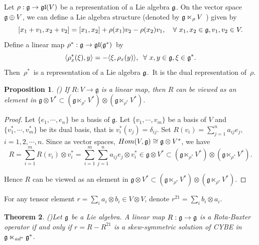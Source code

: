 \documentclass[12pt, reqno]{amsart}
\theoremstyle{plain}
\newtheorem{theorem}{Theorem}[section]
\newtheorem{proposition}[theorem]{Proposition}
\def \g  {\mathfrak{g}}   %
\def \gl {\mathfrak{gl}}
\begin{document}
Let $\rho: \frak g \rightarrow \gl(V)$ be a representation of a Lie algebra $\frak g$.
On the vector space $\frak g \oplus V$,
we can define a Lie algebra structure
(denoted by $\frak g \ltimes_{\rho} V$ ) given by
\begin{equation}\label{Lie algebra structure}
 [x_{1} + v_{1}, x_{2} + v_{2}] = [x_{1}, x_{2}] + \rho(x_{1})v_{2} -
\rho(x_{2})v_{1},\quad \forall ~x_{1}, x_{2} \in \frak g, v_{1}, v_{2} \in V.
\end{equation}
Define a linear map $\rho^{\ast}: {\frak g} \rightarrow \gl({\frak g}^{\ast})$~by
\begin{equation}\label{dual rep}
\langle \rho_x^*(\xi),y \rangle=-\langle\xi, \rho_x(y)\rangle, \;\;
\forall~ x, y\in \g, \xi\in {\frak g}^*.
\end{equation}
Then~$\rho^{\ast}$~is a representation of a Lie algebra $\frak g$.~It is
the dual representation of~$\rho$.
\begin{proposition}\label{element in G+V}\rm{(\cite{Bai})}
If $R : V \rightarrow \mathfrak{g}$ is a linear map, then $R$ can be viewed
as an element in $\mathfrak{g}\otimes V^{\ast}
\subset (\mathfrak{g} \ltimes_{\rho^{\ast}} V^{\ast} ) \otimes
(\mathfrak{g} \ltimes_{\rho^{\ast}} V^{\ast} )$.
\end{proposition}
\begin{proof}
Let $\{e_{1},\cdots , e_{n}\}$ be a basis of $\mathfrak{g}$.
Let $\{v_{1}, \cdots , v_{m}\}$ be a basis of $V$ and
$\{v^{\ast}_{1},\cdots, v^{\ast}_{m}\}$ be its dual basis,
that is $v^{\ast}_{i} (v_{j}) = \delta_{ij}$.
Set $R(v_{i}) =\sum\limits_{j=1}^{n} a_{ij}e_{j},$ $i=1,2,\cdots, n$.
Since as vector spaces, ${\rm Hom}(V, \mathfrak{g}) \cong \mathfrak{g}
\otimes V^{\ast}$, we have
\begin{equation}
R = \sum_{i=1}^{m} R(v_{i}) \otimes v_{i}^{\ast} =
\sum_{i=1}^{m} \sum_{j=1}^{n} a_{ij} e_{j} \otimes v_{i}^{\ast}
\in \mathfrak{g} \otimes V^{\ast} \subset
(\mathfrak{g} \ltimes_{\rho^{\ast}} V^{\ast} ) \otimes
(\mathfrak{g} \ltimes_{\rho^{\ast}} V^{\ast} ).
\end{equation}

Hence $R$ can be viewed
as an element in $\mathfrak{g}\otimes V^{\ast}
\subset (\mathfrak{g} \ltimes_{\rho^{\ast}} V^{\ast} ) \otimes
(\mathfrak{g} \ltimes_{\rho^{\ast}} V^{\ast} )$.
\end{proof}

For any tensor element $r=\sum_i a_i\otimes b_i\in V \otimes V$, denote $r^{21}=\sum_ib_i\otimes a_i$.

\begin{theorem}\rm{(\cite{Bai})}\label{Bai:classical}
Let $\frak g$ be a Lie algebra. A linear map $R: \frak g\rightarrow \frak g$ is a Rota-Baxter operator if and only if
$r = R - R^{21}$ is a skew-symmetric solution of CYBE
in $\mathfrak{g} \ltimes_{{\rm ad}^{\ast}} \frak g^{\ast}$.
\end{theorem}
\end{document}
